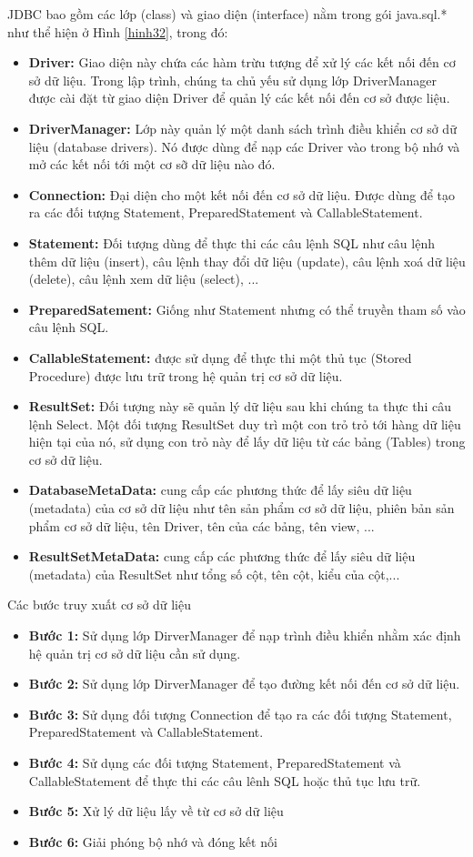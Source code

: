 JDBC bao gồm các lớp (class) và giao diện (interface) nằm trong gói java.sql.* như thể hiện ở Hình \ref{hinh32}, trong đó:
\begin{itemize}
	\item \textbf{Driver:} Giao diện này chứa các hàm trừu tượng để xử lý các kết nối đến cơ sở dữ liệu. Trong lập trình, chúng ta chủ yếu sử dụng lớp DriverManager được cài đặt từ giao diện Driver để quản lý các kết nối đến cơ sở được liệu.
	\item \textbf{DriverManager:} Lớp này quản lý một danh sách trình điều khiển cơ sở dữ liệu 	(database drivers).  Nó được dùng để nạp các Driver vào trong bộ nhớ và mở các kết nối tới một cơ sỡ dữ liệu nào đó.
	\item \textbf{Connection:} Đại diện cho một kết nối đến cơ sở dữ liệu. Được dùng để tạo ra các đối tượng Statement, PreparedStatement và CallableStatement.
	\item \textbf{Statement:} Đối tượng dùng để thực thi các câu lệnh SQL như câu lệnh thêm dữ liệu
	(insert), câu lệnh thay đổi dữ liệu (update), câu lệnh xoá dữ liệu (delete), câu lệnh
	xem dữ liệu (select), ...
	\item \textbf{PreparedSatement:} Giống như Statement nhưng có thể truyền tham số vào câu lệnh SQL.
	\item \textbf{CallableStatement:} được sử dụng để thực thi một thủ tục (Stored Procedure) được lưu trữ trong  hệ quản trị cơ sở dữ liệu.
	\item \textbf{ResultSet:} Đối tượng này sẽ quản lý dữ liệu sau khi chúng ta thực thi câu lệnh Select.  Một đối tượng ResultSet duy trì một con trỏ trỏ tới hàng dữ liệu hiện tại của nó, sử dụng con trỏ này để lấy dữ liệu từ các bảng (Tables) trong cơ sở dữ liệu.
	\item \textbf{DatabaseMetaData: }cung cấp các phương thức để lấy siêu dữ liệu (metadata) của cơ sở dữ liệu như tên sản phẩm cơ sở dữ liệu, phiên bản sản phẩm cơ sở dữ liệu, tên Driver, tên của các bảng, tên  view, ...
	\item \textbf{ResultSetMetaData:} cung cấp các phương thức để lấy siêu dữ liệu (metadata) của ResultSet như  tổng số cột, tên cột, kiểu của cột,...
\end{itemize}
Các bước truy xuất cơ sở dữ liệu
\begin{itemize}

\item \textbf{Bước 1:} Sử dụng lớp DirverManager để nạp trình điều khiển nhằm xác định hệ quản trị cơ sở dữ liệu cần sử dụng.
	\item \textbf{Bước 2:} Sử dụng lớp DirverManager  để tạo đường kết nối đến cơ sở dữ liệu. 
	\item \textbf{Bước 3:} Sử dụng đối tượng Connection để tạo ra các đối tượng Statement, PreparedStatement và CallableStatement.
	\item \textbf{Bước 4:}  Sử dụng các đối tượng Statement, PreparedStatement và CallableStatement để thực thi các câu lênh SQL hoặc thủ tục lưu trữ.
	\item \textbf{Bước 5:} Xử lý dữ liệu lấy về từ cơ sở dữ liệu
	\item  \textbf{Bước 6:} Giải phóng bộ nhớ và đóng kết nối

\end{itemize}
